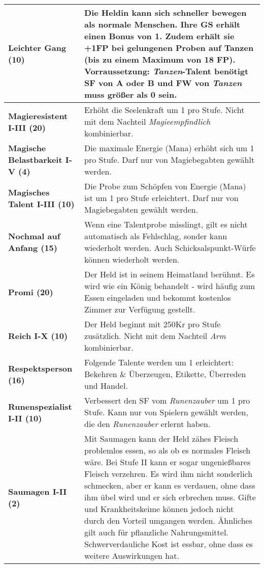 \begin{longtable}{|p{5cm}|p{11cm}|}
\textbf{Leichter Gang (10)} & Die Heldin kann sich schneller bewegen als normale Menschen. Ihre GS erhält einen Bonus von 1. Zudem erhält sie +1FP bei gelungenen Proben auf Tanzen (bis zu einem Maximum von 18 FP). Vorraussetzung: \textit{Tanzen}-Talent benötigt SF von A oder B und FW von \textit{Tanzen} muss größer als 0 sein. \\ \hline

\textbf{Magieresistent I-III (20)} & Erhöht die Seelenkraft um 1 pro Stufe. Nicht mit dem Nachteil \textit{Magieempfindlich} kombinierbar. \\ \hline

\textbf{Magische Belastbarkeit I-V (4)} & Die maximale Energie (Mana) erhöht sich um 1 pro Stufe. Darf nur von Magiebegabten gewählt werden. \\ \hline

\textbf{Magisches Talent I-III (10)} & Die Probe zum Schöpfen von Energie (Mana) ist um 1 pro Stufe erleichtert. Darf nur von Magiebegabten gewählt werden. \\ \hline 

\textbf{Nochmal auf Anfang (15)} & Wenn eine Talentprobe misslingt, gilt es nicht automatisch als Fehlschlag, sonder kann wiederholt werden. Auch Schicksalspunkt-Würfe können wiederholt werden. \\ \hline

\textbf{Promi (20)} & Der Held ist in seinem Heimatland berühmt. Es wird wie ein König behandelt - wird häufig zum Essen eingeladen und bekommt kostenlos Zimmer zur Verfügung gestellt. \\ \hline

\textbf{Reich I-X (10)} & Der Held beginnt mit 250Kr pro Stufe zusätzlich. Nicht mit dem Nachteil \textit{Arm} kombinierbar. \\ \hline

\textbf{Respektsperson (16)} & Folgende Talente werden um 1 erleichtert: Bekehren \& Überzeugen, Etikette, Überreden und Handel. \\ \hline

\textbf{Runenspezialist I-II (10)} & Verbessert den SF vom \textit{Runenzauber} um 1 pro Stufe. Kann nur von Spielern gewählt werden, die den \textit{Runenzauber} erlernt haben. \\ \hline

\textbf{Saumagen I-II (2)} & Mit Saumagen kann der Held zähes Fleisch problemlos essen, so als ob es normales Fleisch wäre. Bei Stufe II kann er sogar ungenießbares Fleisch verzehren. Es wird ihm nicht sonderlich schmecken, aber er kann es verdauen, ohne dass ihm übel wird und er sich erbrechen muss. Gifte und Krankheitskeime können jedoch nicht durch den Vorteil umgangen werden. Ähnliches gilt auch für pflanzliche Nahrungsmittel. Schwerverdauliche Kost ist essbar, ohne dass es weitere Auswirkungen hat. \\ \hline


\end{longtable}
